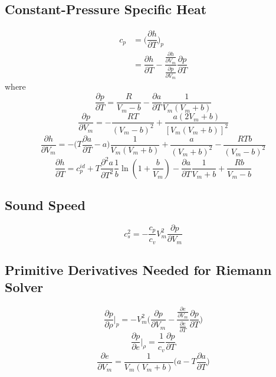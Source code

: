 \subsection*{Constant-Pressure Specific Heat}
\begin{equation}
\begin{split}
c_p &= \biggl(\dfrac{\partial h}{\partial T}\biggr)_{p} \\
&= \dfrac{\partial h}{\partial T} - \dfrac{\tfrac{\partial h}{\partial V_m}}{\tfrac{\partial p}{\partial V_m}}\dfrac{\partial p}{\partial T}
\end{split}
\end{equation}
where
\begin{equation}
\frac{\partial p}{\partial T}=\frac{R}{V_m-b}-\frac{\partial a}{\partial T}\frac{1}{V_m(V_m+b)}
\end{equation}
\begin{equation}
\frac{\partial p}{\partial V_m}=-\frac{RT}{(V_m-b)^2}+\frac{a(2V_m+b)}{[V_m(V_m+b)]^2}
\end{equation}
\begin{equation}
\frac{\partial h}{\partial V_m}=-\biggl(T\frac{\partial a}{\partial T}-a\biggr)\frac{1}{V_m(V_m+b)}+\frac{a}{(V_m+b)^2}-\frac{RTb}{(V_m-b)^2}
\end{equation}
\begin{equation}
\frac{\partial h}{\partial T}=c_{p}^{id}+T\frac{\partial^2 a}{\partial T^2}\frac{1}{b}\ln(1+\frac{b}{V_m})-\frac{\partial a}{\partial T}\frac{1}{V_m +b}+\frac{Rb}{V_m-b}
\end{equation}

\subsection*{Sound Speed}
\begin{equation}
c_s^2=-\frac{c_p}{c_v}V_m^2\frac{\partial p}{\partial V_m}
\end{equation}

\subsection*{Primitive Derivatives Needed for Riemann Solver}
\begin{equation}
\frac{\partial p}{\partial \rho}\bigg|_{p}=-V_m^2\biggl(\frac{\partial p}{\partial V_m}-\dfrac{\frac{\partial e}{\partial V_m}}{\frac{\partial e}{\partial T}}\frac{\partial p}{\partial T}\biggr)
\end{equation}
\begin{equation}
\frac{\partial p}{\partial e}\bigg|_{\rho}=\frac{1}{c_v}\frac{\partial p}{\partial T}
\end{equation}
\begin{equation}
\frac{\partial e}{\partial V_m}=\frac{1}{V_m(V_m+b)}\biggl(a-T\frac{\partial a}{\partial T}\biggr)
\end{equation}


